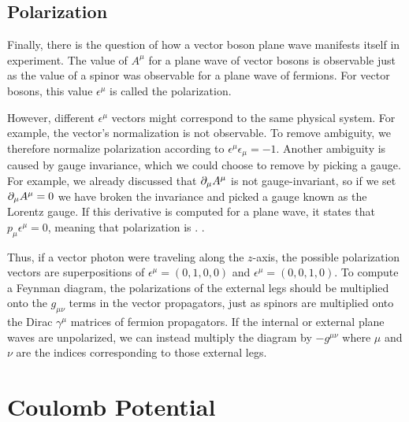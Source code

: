 \subsection{Polarization}

Finally, there is the question of how a vector boson plane wave manifests itself in experiment. The value of $A^\mu$ for a plane wave of vector bosons is observable just as the value of a spinor was observable for a plane wave of fermions. For vector bosons, this value $\epsilon^\mu$ is called the polarization. 

However, different $\epsilon^\mu$ vectors might correspond to the same physical system. For example, the vector's normalization is not observable. To remove ambiguity, we therefore normalize polarization according to $\epsilon^\mu \epsilon_\mu = -1$.  Another ambiguity is caused by gauge invariance, which we could choose to remove by picking a gauge. For example, we already discussed that $\partial_\mu A^\mu$ is not gauge-invariant, so if we set $\partial_\mu A^\mu=0$ we have broken the invariance and picked a gauge known as the Lorentz gauge. If this derivative is computed for a plane wave, it states that $p_\mu \epsilon^\mu = 0$, meaning that polarization is . .

Thus, if a vector photon were traveling along the $z$-axis, the possible polarization vectors are superpositions of $\epsilon^\mu = (0, 1, 0, 0)$ and $\epsilon^\mu = (0, 0, 1, 0)$. To compute a Feynman diagram, the polarizations of the external legs should be multiplied onto the $g_{\mu\nu}$ terms in the vector propagators, just as spinors are multiplied onto the Dirac $\gamma^\mu$ matrices of fermion propagators. If the internal or external plane waves are unpolarized, we can instead multiply the diagram by $-g^{\mu \nu}$ where $\mu$ and $\nu$ are the indices corresponding to those external legs.


\section{Coulomb Potential}
\label{sec:vector-coulomb}

